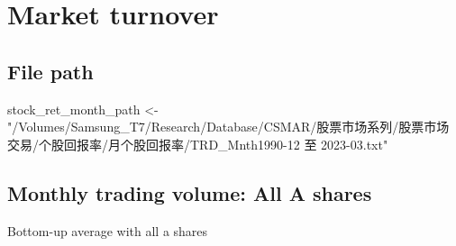 \documentclass[
]{article}
\newenvironment{Shaded}{\begin{snugshade}}{\end{snugshade}}
\newcommand{\NormalTok}[1]{#1}
\newcommand{\OtherTok}[1]{\textcolor[rgb]{0.56,0.35,0.01}{#1}}
\newcommand{\StringTok}[1]{\textcolor[rgb]{0.31,0.60,0.02}{#1}}
\begin{document}
\hypertarget{market-turnover}{%
\section{Market turnover}\label{market-turnover}}

\hypertarget{file-path-2}{%
\subsection{File path}\label{file-path-2}}

\begin{Shaded}
\begin{Highlighting}[]
\NormalTok{stock\_ret\_month\_path }\OtherTok{\textless{}{-}} \StringTok{"/Volumes/Samsung\_T7/Research/Database/CSMAR/股票市场系列/股票市场交易/个股回报率/月个股回报率/TRD\_Mnth1990{-}12 至 2023{-}03.txt"}
\end{Highlighting}
\end{Shaded}

\hypertarget{monthly-trading-volume-all-a-shares}{%
\subsection{Monthly trading volume: All A shares}\label{monthly-trading-volume-all-a-shares}}

Bottom-up average with all a shares
\end{document}
